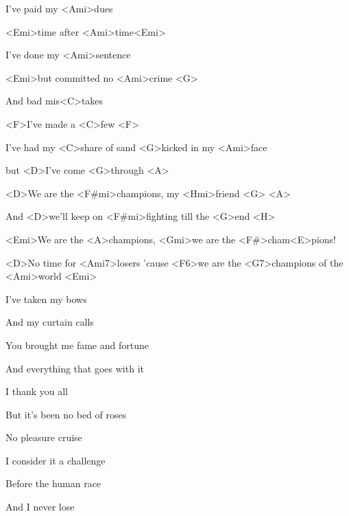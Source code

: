 

\zs
I've paid my <Ami>dues

<Emi>time after <Ami>time<Emi>

I've done my <Ami>sentence

<Emi>but committed no <Ami>crime <G>

And bad mis<C>takes

<F>I've made a <C>few <F>

I've had my <C>share of sand <G>kicked in my <Ami>face

but <D>I've come <G>through <A>
\ks

\zr
<D>We are the <F#mi>champions, my <Hmi>friend <G> <A>

And <D>we'll keep on <F#mi>fighting till the <G>end <H>

<Emi>We are the <A>champions, <Gmi>we are the <F#>cham<E>pions!

<D>No time for <Ami7>losers 'cause <F6>we are the <G7>champions of the <Ami>world <Emi>
\kr

\zs
I've taken my bows

And my curtain calls

You brought me fame and fortune

And everything that goes with it

I thank you all

But it's been no bed of roses

No pleasure cruise

I consider it a challenge

Before the human race

And I never lose
\ks

\zr \kr

\kp























